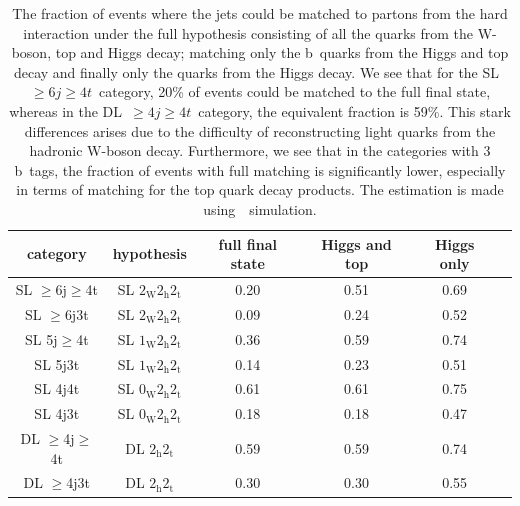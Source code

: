 \begin{table}[h!]
\begin{center}
\begin{tabular}{c|ccccc}
\hline
category & hypothesis & full final state & Higgs and top & Higgs only \\
\hline
SL $\geq$6j$\geq$4t & SL $2_{\mathrm{W}} 2_{\mathrm{h}} 2_{\mathrm{t}}$ & 0.20 & 0.51 & 0.69 \\
SL $\geq$6j3t & SL $2_{\mathrm{W}} 2_{\mathrm{h}} 2_{\mathrm{t}}$ & 0.09 & 0.24 & 0.52 \\
SL 5j$\geq$4t & SL $1_{\mathrm{W}} 2_{\mathrm{h}} 2_{\mathrm{t}}$ & 0.36 & 0.59 & 0.74 \\
SL 5j3t & SL $1_{\mathrm{W}} 2_{\mathrm{h}} 2_{\mathrm{t}}$  & 0.14 & 0.23 & 0.51 \\
SL 4j4t & SL $0_{\mathrm{W}} 2_{\mathrm{h}} 2_{\mathrm{t}}$ & 0.61 & 0.61 & 0.75 \\
SL 4j3t & SL $0_{\mathrm{W}} 2_{\mathrm{h}} 2_{\mathrm{t}}$  & 0.18 & 0.18 & 0.47 \\
\hline
DL $\geq$4j$\geq$4t & DL $2_{\mathrm{h}} 2_{\mathrm{t}}$ & 0.59 & 0.59 & 0.74 \\
DL $\geq$4j3t & DL $2_{\mathrm{h}} 2_{\mathrm{t}}$ & 0.30 & 0.30 & 0.55 \\
\hline
\hline
\end{tabular}
\caption[The fraction of matched events in the analysis categories]{The fraction of events where the jets could be matched to partons from the hard interaction under the full hypothesis consisting of all the quarks from the W-boson, top and Higgs decay; matching only the b~quarks from the Higgs and top decay and finally only the quarks from the Higgs decay. We see that for the SL~$\geq6j\geq4t$~category, 20\% of events could be matched to the full final state, whereas in the DL~$\geq4j\geq4t$~category, the equivalent fraction is 59\%. This stark differences arises due to the difficulty of reconstructing light quarks from the hadronic W-boson decay. Furthermore, we see that in the categories with 3 b~tags, the fraction of events with full matching is significantly lower, especially in terms of matching for the top quark decay products. The estimation is made using~\ttHbb~simulation.}
\end{center}
\label{tab:matching_fracs}
\end{table}

